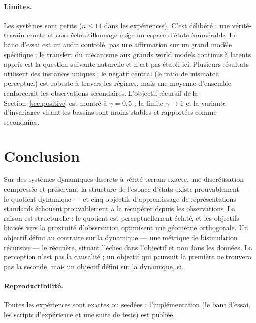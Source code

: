 \documentclass[11pt]{article}
\begin{document}
\paragraph{Limites.}
Les systèmes sont petits ($n \le 14$ dans les expériences). C'est délibéré : une
vérité-terrain exacte et sans échantillonnage exige un espace d'états
énumérable. Le banc d'essai est un audit contrôlé, pas une affirmation sur un
grand modèle spécifique ; le transfert du mécanisme aux grands world models
continus à latents appris est la question suivante naturelle et n'est pas
établi ici. Plusieurs résultats utilisent des instances uniques ; le négatif
central (le ratio de mismatch perceptuel) est robuste à travers les régimes,
mais une moyenne d'ensemble renforcerait les observations secondaires.
L'objectif récursif de la Section~\ref{sec:positive} est montré à
$\gamma{=}0{,}5$ ; la limite $\gamma\to1$ et la variante d'invariance visant
les bassins sont moins stables et rapportées comme secondaires.

\section{Conclusion}

Sur des systèmes dynamiques discrets à vérité-terrain exacte, une discrétisation
compressée et préservant la structure de l'espace d'états existe prouvablement
--- le quotient dynamique --- et cinq objectifs d'apprentissage de
représentations standards échouent prouvablement à la récupérer depuis les
observations. La raison est structurelle : le quotient est perceptuellement
éclaté, et les objectifs biaisés vers la proximité d'observation optimisent une
géométrie orthogonale. Un objectif défini au contraire sur la dynamique --- une
métrique de bisimulation récursive --- le récupère, situant l'échec dans
l'objectif et non dans les données. La perception n'est pas la causalité ; un
objectif qui poursuit la première ne trouvera pas la seconde, mais un objectif
défini sur la dynamique, si.

\paragraph{Reproductibilité.}
Toutes les expériences sont exactes ou seedées ; l'implémentation (le banc
d'essai, les scripts d'expérience et une suite de tests) est publiée.



\end{document}
